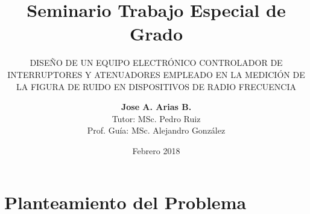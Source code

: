 \documentclass[xcolor=pdftext, table]{beamer}
\begin{document}
	\title{Seminario Trabajo Especial de Grado}
	
	\subtitle{\large DISEÑO DE UN EQUIPO ELECTRÓNICO CONTROLADOR DE
		INTERRUPTORES Y ATENUADORES EMPLEADO EN LA
		MEDICIÓN DE LA FIGURA DE RUIDO EN DISPOSITIVOS DE
		RADIO FRECUENCIA}
		
	\author{{\bf Jose A. Arias B.} \\
		{Tutor: MSc. Pedro Ruiz}\\
		{Prof. Guía: MSc. Alejandro González}}				

		
	
	\date{Febrero 2018}
	
	
	\frame{\titlepage}
	
	\section{Planteamiento del Problema}
	
	
\end{document}
